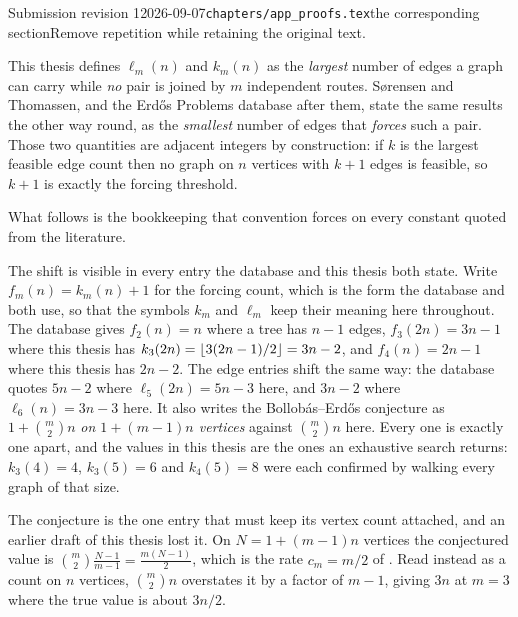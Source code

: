 \begin{offcut}{Submission revision 1}{2026-09-07}{\texttt{chapters/app\_proofs.tex}}{the corresponding section}{Remove repetition while retaining the original text.}
\begin{remark}
This thesis defines $\ell_m(n)$ and $k_m(n)$ as the \emph{largest} number of edges a graph can carry while \emph{no} pair is joined by $m$ independent routes.
S{\o}rensen and Thomassen, and the Erd\H{o}s Problems database \cite{ErdosProblems} after them, state the same results the other way round, as the \emph{smallest} number of edges that \emph{forces} such a pair.
Those two quantities are adjacent integers by construction: if $k$ is the largest feasible edge count then no graph on $n$ vertices with $k+1$ edges is feasible, so $k+1$ is exactly the forcing threshold.

What follows is the bookkeeping that convention forces on every constant quoted from the literature.

The shift is visible in every entry the database and this thesis both state. Write $f_m(n) = k_m(n) + 1$ for the forcing count, which is the form the database and \cite{SorensenThomassen74} both use, so that the symbols $k_m$ and $\ell_m$ keep their meaning here throughout. The database gives $f_2(n) = n$ where a tree has $n-1$ edges, $f_3(2n) = 3n-1$ where this thesis has $k_3(2n) = \left\lfloor 3(2n-1)/2 \right\rfloor = 3n-2$, and $f_4(n) = 2n-1$ where this thesis has $2n-2$. The edge entries shift the same way: the database quotes $5n-2$ where $\ell_5(2n) = 5n-3$ here, and $3n-2$ \cite{Leonard73} where $\ell_6(n) = 3n-3$ here. It also writes the Bollob\'{a}s--Erd\H{o}s conjecture as $1 + \binom{m}{2}n$ \emph{on $1 + (m-1)n$ vertices} against $\binom{m}{2}n$ here. Every one is exactly one apart, and the values in this thesis are the ones an exhaustive search returns: $k_3(4) = 4$, $k_3(5) = 6$ and $k_4(5) = 8$ were each confirmed by walking every graph of that size.

The conjecture is the one entry that must keep its vertex count attached, and an earlier draft of this thesis lost it. On $N = 1 + (m-1)n$ vertices the conjectured value is $\binom{m}{2}\frac{N-1}{m-1} = \frac{m(N-1)}{2}$, which is the rate $c_m = m/2$ of . Read instead as a count on $n$ vertices, $\binom{m}{2}n$ overstates it by a factor of $m-1$, giving $3n$ at $m = 3$ where the true value is about $3n/2$.


\end{remark}
\end{offcut}
